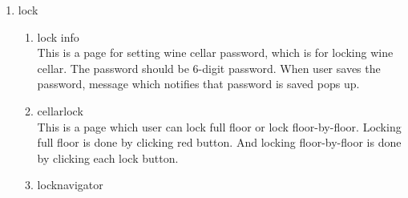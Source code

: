 \documentclass[sigconf, nonacm]{acmart}
\begin{document}
\begin {enumerate}
\begin{enumerate}
When user clicks the setting image, user goes to WineCellarSetting page. 
When user clicks the share image, user can share the image of wine cellar in Instagram. And ‘\#LGwinecellar, \#MyWineCellar, \#DIOnyoS’ hashtags are uploaded together in Instagram posting.
\item WineCellarSetting\\
 There are three parts in wine cellar setting page. First part is  nickname setting page. User can freely make the nickname of wine cellar. Second part is temperature control page. User can set the temperature of physical wine cellar by our application. Third part is Humidity control page. User can set the humidity of physical wine cellar by our application.
 \item WineTab\\
  It is tab which locates in the bottom of page. By clicking wine tab, user can move to wine cellar, lock main, wine registration, wine recommendation and share navigator. 
  \item WineCellarNavigator\\
This is a navigation which enables transition between WineCellar and WineCellarSetting.
\end{enumerate}
\item lock
\begin{enumerate}
    \item lock info\\
     This is a page for setting wine cellar password, which is for locking wine cellar. The password should be 6-digit password. When user saves the password, message which notifies that password is saved pops up.
    \item cellarlock\\
    
 This is a page which user can lock full floor or lock floor-by-floor. Locking full floor is done by clicking red button. And locking floor-by-floor is done by clicking each lock button. 
 \item locknavigator\\
 

\end{enumerate}
\end{enumerate}
\end{document}
